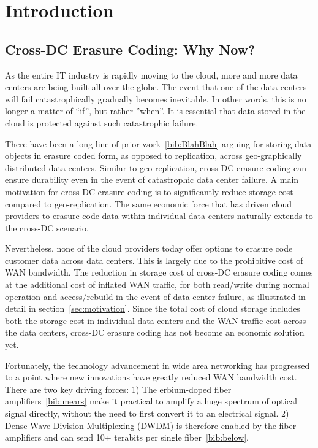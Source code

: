 \section{Introduction}

\subsection{Cross-DC Erasure Coding: Why Now?}

As the entire IT industry is rapidly moving to the cloud, more and more data centers are being built all over the globe. The event that one of the data centers will fail catastrophically gradually becomes inevitable. In other words, this is no longer a matter of ``if'', but rather ''when''. It is essential that data stored in the cloud is protected against such catastrophic failure.

There have been a long line of prior work~\ref{bib:BlahBlah} arguing for storing data objects in erasure coded form, as opposed to replication, across geo-graphically distributed data centers. Similar to geo-replication, cross-DC erasure coding can ensure durability even in the event of catastrophic data center failure. A main motivation for cross-DC erasure coding is to significantly reduce storage cost compared to geo-replication. The same economic force that has driven cloud providers to erasure code data within individual data centers naturally extends to the cross-DC scenario.

Nevertheless, none of the cloud providers today offer options to erasure code customer data across data centers. This is largely due to the prohibitive cost of WAN bandwidth. The reduction in storage cost of cross-DC erasure coding comes at the additional cost of inflated WAN traffic, for both read/write during normal operation and access/rebuild in the event of data center failure, as illustrated in detail in section~\ref{sec:motivation}.
Since the total cost of cloud storage includes both the storage cost in individual data centers and the WAN traffic cost across the data centers, cross-DC erasure coding has not become an economic solution yet.

Fortunately, the technology advancement in wide area networking has progressed to a point where new innovations have greatly reduced WAN bandwidth cost. There are two key driving forces: 1) The erbium-doped fiber amplifiers~\ref{bib:mears} make it practical to amplify a huge spectrum of optical signal directly, without the need to first convert it to an electrical signal. 2) Dense Wave Division Multiplexing (DWDM) is therefore enabled by the fiber amplifiers and can send 10+ terabits per single fiber~\ref{bib:below}.

